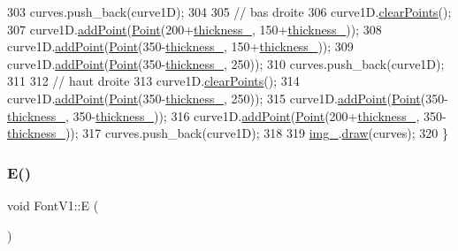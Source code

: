 \begin{DoxyCode}
303     curves.push\_back(curve1D);
304 
305     \textcolor{comment}{// bas droite}
306     curve1D.\mbox{\hyperlink{class_bezier_curve_a0ba8ce66d5af5971ae6a1b506029728e}{clearPoints}}();
307     curve1D.\mbox{\hyperlink{class_bezier_curve_a38d16c18b36ae45619b05e26e226cf34}{addPoint}}(\mbox{\hyperlink{class_point}{Point}}(200+\mbox{\hyperlink{class_font_v1_aed8040e76be9a52833627b92f0fb4e5f}{thickness\_}}, 150+\mbox{\hyperlink{class_font_v1_aed8040e76be9a52833627b92f0fb4e5f}{thickness\_}}));
308     curve1D.\mbox{\hyperlink{class_bezier_curve_a38d16c18b36ae45619b05e26e226cf34}{addPoint}}(\mbox{\hyperlink{class_point}{Point}}(350-\mbox{\hyperlink{class_font_v1_aed8040e76be9a52833627b92f0fb4e5f}{thickness\_}}, 150+\mbox{\hyperlink{class_font_v1_aed8040e76be9a52833627b92f0fb4e5f}{thickness\_}}));
309     curve1D.\mbox{\hyperlink{class_bezier_curve_a38d16c18b36ae45619b05e26e226cf34}{addPoint}}(\mbox{\hyperlink{class_point}{Point}}(350-\mbox{\hyperlink{class_font_v1_aed8040e76be9a52833627b92f0fb4e5f}{thickness\_}}, 250));
310     curves.push\_back(curve1D);
311 
312     \textcolor{comment}{// haut droite}
313     curve1D.\mbox{\hyperlink{class_bezier_curve_a0ba8ce66d5af5971ae6a1b506029728e}{clearPoints}}();
314     curve1D.\mbox{\hyperlink{class_bezier_curve_a38d16c18b36ae45619b05e26e226cf34}{addPoint}}(\mbox{\hyperlink{class_point}{Point}}(350-\mbox{\hyperlink{class_font_v1_aed8040e76be9a52833627b92f0fb4e5f}{thickness\_}}, 250));
315     curve1D.\mbox{\hyperlink{class_bezier_curve_a38d16c18b36ae45619b05e26e226cf34}{addPoint}}(\mbox{\hyperlink{class_point}{Point}}(350-\mbox{\hyperlink{class_font_v1_aed8040e76be9a52833627b92f0fb4e5f}{thickness\_}}, 350-\mbox{\hyperlink{class_font_v1_aed8040e76be9a52833627b92f0fb4e5f}{thickness\_}}));
316     curve1D.\mbox{\hyperlink{class_bezier_curve_a38d16c18b36ae45619b05e26e226cf34}{addPoint}}(\mbox{\hyperlink{class_point}{Point}}(200+\mbox{\hyperlink{class_font_v1_aed8040e76be9a52833627b92f0fb4e5f}{thickness\_}}, 350-\mbox{\hyperlink{class_font_v1_aed8040e76be9a52833627b92f0fb4e5f}{thickness\_}}));
317     curves.push\_back(curve1D);
318 
319     \mbox{\hyperlink{class_font_v1_a00569e3e3c4b70f437b63f396f735fb0}{img\_}}.\mbox{\hyperlink{class_image_a8d162f3cab956131d58708c09aa560b0}{draw}}(curves);
320 \}
\end{DoxyCode}
\mbox{\label{class_font_v1_ab8a34299af7a36cfd94c2691b579a0fa}} 
\subsubsection{\texorpdfstring{E()}{E()}}
{\footnotesize\ttfamily void Font\+V1\+::E (\begin{DoxyParamCaption}{ }\end{DoxyParamCaption})}



